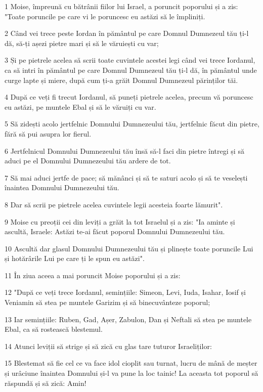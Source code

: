 \par 1 Moise, împreună cu bătrânii fiilor lui Israel, a poruncit poporului și a zis: "Toate poruncile pe care vi le poruncesc eu astăzi să le împliniți.
\par 2 Când vei trece peste Iordan în pământul pe care Domnul Dumnezeul tău ți-l dă, să-ți așezi pietre mari și să le văruiești cu var;
\par 3 Și pe pietrele acelea să scrii toate cuvintele acestei legi când vei trece Iordanul, ca să intri în pământul pe care Domnul Dumnezeul tău ți-l dă, în pământul unde curge lapte și miere, după cum ți-a grăit Domnul Dumnezeul părinților tăi.
\par 4 După ce veți fi trecut Iordanul, să puneți pietrele acelea, precum vă poruncesc eu astăzi, pe muntele Ebal și să le văruiți cu var.
\par 5 Să zidești acolo jertfelnic Domnului Dumnezeului tău, jertfelnic făcut din pietre, fără să pui asupra lor fierul.
\par 6 Jertfelnicul Domnului Dumnezeului tău însă să-l faci din pietre întregi și să aduci pe el Domnului Dumnezeului tău ardere de tot.
\par 7 Să mai aduci jertfe de pace; să mănânci și să te saturi acolo și să te veselești înaintea Domnului Dumnezeului tău.
\par 8 Dar să scrii pe pietrele acelea cuvintele legii acesteia foarte lămurit".
\par 9 Moise cu preoții cei din leviți a grăit la tot Israelul și a zis: "Ia aminte și ascultă, Israele: Astăzi te-ai făcut poporul Domnului Dumnezeului tău.
\par 10 Ascultă dar glasul Domnului Dumnezeului tău și plinește toate poruncile Lui și hotărârile Lui pe care ți le spun eu astăzi".
\par 11 În ziua aceea a mai poruncit Moise poporului și a zis:
\par 12 "După ce veți trece Iordanul, semințiile: Simeon, Levi, Iuda, Isahar, Iosif și Veniamin să stea pe muntele Garizim și să binecuvânteze poporul;
\par 13 Iar semințiile: Ruben, Gad, Așer, Zabulon, Dan și Neftali să stea pe muntele Ebal, ca să rostească blestemul.
\par 14 Atunci leviții să strige și să zică cu glas tare tuturor Israeliților:
\par 15 Blestemat să fie cel ce va face idol cioplit sau turnat, lucru de mână de meșter și urâciune înaintea Domnului și-l va pune la loc tainic! La aceasta tot poporul să răspundă și să zică: Amin!
